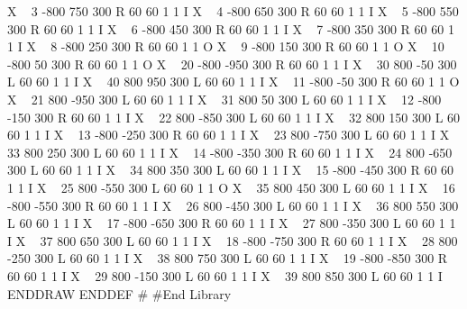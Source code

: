X ~ 3 -800 750 300 R 60 60 1 1 I
X ~ 4 -800 650 300 R 60 60 1 1 I
X ~ 5 -800 550 300 R 60 60 1 1 I
X ~ 6 -800 450 300 R 60 60 1 1 I
X ~ 7 -800 350 300 R 60 60 1 1 I
X ~ 8 -800 250 300 R 60 60 1 1 O
X ~ 9 -800 150 300 R 60 60 1 1 O
X ~ 10 -800 50 300 R 60 60 1 1 O
X ~ 20 -800 -950 300 R 60 60 1 1 I
X ~ 30 800 -50 300 L 60 60 1 1 I
X ~ 40 800 950 300 L 60 60 1 1 I
X ~ 11 -800 -50 300 R 60 60 1 1 O
X ~ 21 800 -950 300 L 60 60 1 1 I
X ~ 31 800 50 300 L 60 60 1 1 I
X ~ 12 -800 -150 300 R 60 60 1 1 I
X ~ 22 800 -850 300 L 60 60 1 1 I
X ~ 32 800 150 300 L 60 60 1 1 I
X ~ 13 -800 -250 300 R 60 60 1 1 I
X ~ 23 800 -750 300 L 60 60 1 1 I
X ~ 33 800 250 300 L 60 60 1 1 I
X ~ 14 -800 -350 300 R 60 60 1 1 I
X ~ 24 800 -650 300 L 60 60 1 1 I
X ~ 34 800 350 300 L 60 60 1 1 I
X ~ 15 -800 -450 300 R 60 60 1 1 I
X ~ 25 800 -550 300 L 60 60 1 1 O
X ~ 35 800 450 300 L 60 60 1 1 I
X ~ 16 -800 -550 300 R 60 60 1 1 I
X ~ 26 800 -450 300 L 60 60 1 1 I
X ~ 36 800 550 300 L 60 60 1 1 I
X ~ 17 -800 -650 300 R 60 60 1 1 I
X ~ 27 800 -350 300 L 60 60 1 1 I
X ~ 37 800 650 300 L 60 60 1 1 I
X ~ 18 -800 -750 300 R 60 60 1 1 I
X ~ 28 800 -250 300 L 60 60 1 1 I
X ~ 38 800 750 300 L 60 60 1 1 I
X ~ 19 -800 -850 300 R 60 60 1 1 I
X ~ 29 800 -150 300 L 60 60 1 1 I
X ~ 39 800 850 300 L 60 60 1 1 I
ENDDRAW
ENDDEF
#
#End Library
